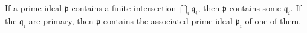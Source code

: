 If a prime ideal $\mathfrak{p}$ contains a finite intersection $\bigcap_i \mathfrak{q}_i$, then $\mathfrak{p}$ contains some $\mathfrak{q}_i$. If the $\mathfrak{q}_i$ are primary, then $\mathfrak{p}$ contains the associated prime ideal $\mathfrak{p}_i$ of one of them.
